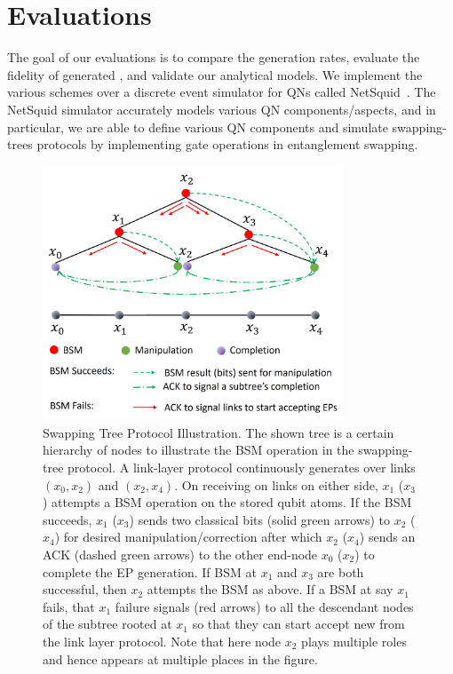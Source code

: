\section{Evaluations}
\label{sec:swapping_eval}

The goal of our evaluations is to compare the \eps generation rates, evaluate
the fidelity of generated \epss, and validate our analytical models.
We implement the various schemes over a discrete event simulator 
for QNs called NetSquid~\cite{netsquid2020}. 
The NetSquid simulator accurately models various QN components/aspects, and
in particular, we are able to 
define various QN components and simulate swapping-trees protocols
by implementing gate operations in entanglement swapping.  


\begin{figure}[ht]
    \centering
    \includegraphics[width=0.8\textwidth]{chapters/swappingtrees/figures/protocol.jpg}
  \caption{Swapping Tree Protocol Illustration.
  The shown tree is a certain hierarchy of nodes to illustrate the BSM operation in the swapping-tree protocol.  
  A link-layer protocol continuously generates \epss over links $(x_0, x_2)$ and $(x_2, x_4)$.
  On receiving \eps on links on either side, $x_1$ ($x_3$) attempts a BSM operation on the stored
  qubit atoms. If the BSM succeeds, $x_1$ ($x_3$) sends two classical bits (solid green arrows) to  $x_2$ ($x_4$) 
  for desired manipulation/correction after which $x_2$ ($x_4$) sends an ACK (dashed green arrows) to the other end-node $x_0$ ($x_2$) to complete the EP generation. If 
  BSM  at  $x_1$ and $x_3$ are both successful, then $x_2$ attempts the BSM as above. 
  If a BSM at say $x_1$ fails, that $x_1$ failure signals (red arrows) to all the descendant nodes of the subtree
  rooted at $x_1$ so that they can start accept new \epss from the link layer protocol. 
  Note that here node $x_2$ plays multiple roles and hence appears at multiple places in the figure.}
  \label{fig:swapping_protocol}
\end{figure}

